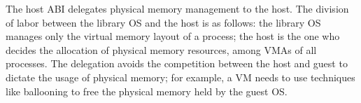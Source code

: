 The host ABI delegates physical memory management to the host. The division of labor between the library OS and the host is as follows:
the library OS manages only the virtual memory layout of a process;
the host is the one who decides the allocation of physical memory resources, among VMAs of all processes.
The delegation avoids the competition between the host and guest
to dictate the usage of physical memory;
for example, a VM needs to use techniques like ballooning to free the physical memory held by the guest OS.







